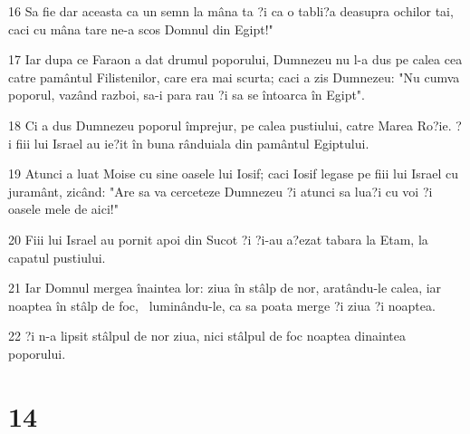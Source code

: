 \par 16 Sa fie dar aceasta ca un semn la mâna ta ?i ca o tabli?a deasupra ochilor tai, caci cu mâna tare ne-a scos Domnul din Egipt!"
\par 17 Iar dupa ce Faraon a dat drumul poporului, Dumnezeu nu l-a dus pe calea cea catre pamântul Filistenilor, care era mai scurta; caci a zis Dumnezeu: "Nu cumva poporul, vazând razboi, sa-i para rau ?i sa se întoarca în Egipt".
\par 18 Ci a dus Dumnezeu poporul împrejur, pe calea pustiului, catre Marea Ro?ie. ?i fiii lui Israel au ie?it în buna rânduiala din pamântul Egiptului.
\par 19 Atunci a luat Moise cu sine oasele lui Iosif; caci Iosif legase pe fiii lui Israel cu juramânt, zicând: "Are sa va cerceteze Dumnezeu ?i atunci sa lua?i cu voi ?i oasele mele de aici!"
\par 20 Fiii lui Israel au pornit apoi din Sucot ?i ?i-au a?ezat tabara la Etam, la capatul pustiului.
\par 21 Iar Domnul mergea înaintea lor: ziua în stâlp de nor, aratându-le calea, iar noaptea în stâlp de foc,  luminându-le, ca sa poata merge ?i ziua ?i noaptea.
\par 22 ?i n-a lipsit stâlpul de nor ziua, nici stâlpul de foc noaptea dinaintea poporului.

\chapter{14}


